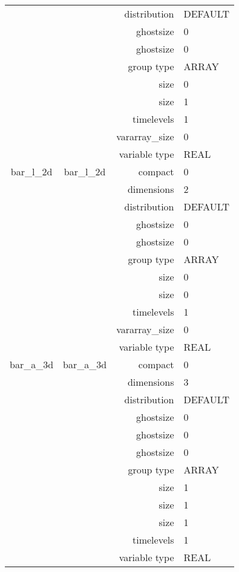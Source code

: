 \begin{tabular*}{150mm}{|c|c@{\extracolsep{\fill}}|rl|}
 &  & distribution & DEFAULT \\ 
 &  & ghostsize & 0 \\ 
& ~ & ghostsize & 0 \\ 
 &  & group type & ARRAY \\ 
 &  & size & 0 \\ 
& ~ & size & 1 \\ 
 &  & timelevels & 1 \\ 
 &  & vararray\_size & 0 \\ 
 &  & variable type & REAL \\ 
\hline 
bar\_l\_2d & bar\_l\_2d & compact & 0 \\ 
 &  & dimensions & 2 \\ 
 &  & distribution & DEFAULT \\ 
 &  & ghostsize & 0 \\ 
& ~ & ghostsize & 0 \\ 
 &  & group type & ARRAY \\ 
 &  & size & 0 \\ 
& ~ & size & 0 \\ 
 &  & timelevels & 1 \\ 
 &  & vararray\_size & 0 \\ 
 &  & variable type & REAL \\ 
\hline 
bar\_a\_3d & bar\_a\_3d & compact & 0 \\ 
 &  & dimensions & 3 \\ 
 &  & distribution & DEFAULT \\ 
 &  & ghostsize & 0 \\ 
& ~ & ghostsize & 0 \\ 
 &  & ghostsize & 0 \\ 
 &  & group type & ARRAY \\ 
 &  & size & 1 \\ 
& ~ & size & 1 \\ 
 &  & size & 1 \\ 
 &  & timelevels & 1 \\ 
 &  & variable type & REAL \\ 
\hline 
\end{tabular*} 



\vspace{5mm}
\vspace{5mm}

